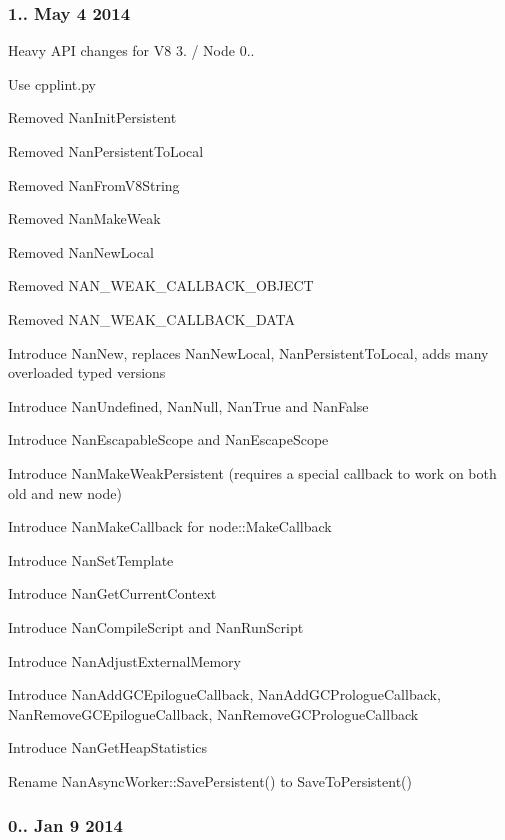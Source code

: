 \subsubsection*{1.. May 4 2014}


\begin{DoxyItemize}
\item Heavy A\+PI changes for V8 3. / Node 0..
\item Use cpplint.\+py
\item Removed Nan\+Init\+Persistent
\item Removed Nan\+Persistent\+To\+Local
\item Removed Nan\+From\+V8\+String
\item Removed Nan\+Make\+Weak
\item Removed Nan\+New\+Local
\item Removed N\+A\+N\+\_\+\+W\+E\+A\+K\+\_\+\+C\+A\+L\+L\+B\+A\+C\+K\+\_\+\+O\+B\+J\+E\+CT
\item Removed N\+A\+N\+\_\+\+W\+E\+A\+K\+\_\+\+C\+A\+L\+L\+B\+A\+C\+K\+\_\+\+D\+A\+TA
\item Introduce Nan\+New, replaces Nan\+New\+Local, Nan\+Persistent\+To\+Local, adds many overloaded typed versions
\item Introduce Nan\+Undefined, Nan\+Null, Nan\+True and Nan\+False
\item Introduce Nan\+Escapable\+Scope and Nan\+Escape\+Scope
\item Introduce Nan\+Make\+Weak\+Persistent (requires a special callback to work on both old and new node)
\item Introduce Nan\+Make\+Callback for node\+::\+Make\+Callback
\item Introduce Nan\+Set\+Template
\item Introduce Nan\+Get\+Current\+Context
\item Introduce Nan\+Compile\+Script and Nan\+Run\+Script
\item Introduce Nan\+Adjust\+External\+Memory
\item Introduce Nan\+Add\+G\+C\+Epilogue\+Callback, Nan\+Add\+G\+C\+Prologue\+Callback, Nan\+Remove\+G\+C\+Epilogue\+Callback, Nan\+Remove\+G\+C\+Prologue\+Callback
\item Introduce Nan\+Get\+Heap\+Statistics
\item Rename Nan\+Async\+Worker\+::\+Save\+Persistent() to Save\+To\+Persistent()
\end{DoxyItemize}

\subsubsection*{0.. Jan 9 2014}


